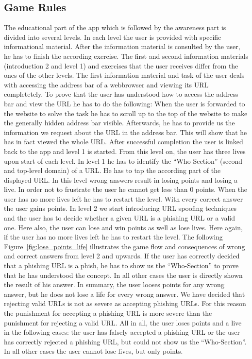 \subsection{Game Rules}
The educational part of the app which is followed by the awareness part is divided into several levels. In each level the user is provided with specific informational material. After the information material is consulted by the user, he has to finish the according exercise. The first  and second information materials (introduction 2 and level 1) and exercises that the user receives differ from the ones of the other levels. The first information material and task of the user deals with accessing the address bar of a webbrowser and viewing its URL completetely. To prove that the user has understood how to access the address bar and view the URL he has to do the following: When the user is forwarded to the website to solve the task he has to scroll up to the top of the website to make the generally hidden address bar visible. Afterwards, he has to provide us the information we request about the URL in the address bar. This will show that he has in fact viewed the whole URL. After successful completion the user is linked back to the app and level 1 is started. From this level on, the user has three lives upon start of each level. In level 1 he has to identify the ``Who-Section'' (second- and top-level domain) of a URL. He has to tap the according part of the displayed URL. In this level wrong answers result in losing points and losing a live. In order not to frustrate the user he cannot get less than 0 points. When the user has no more lives left he has to restart the level. With every correct answer the user gains points.  In level 2 we start introducing URL spoofing techniques and the user has to decide whether a given URL is a phishing URL or a valid one. Here also, the user can lose and win points as well as lose lives. Here again, if the user has no more lives left he has to restart the level. The following Figure~\ref{fig:lose_points_life} illustrates the game flow and consequences of wrong and correct answers from level 2 and upwards. If the user has correctly decided that a phishing URL is a phish, he has to show us the ``Who-Section'' to prove that he has understood the concept. In all other cases the user is directly shown the result of his answer. In summary, the user looses points for any wrong answer, but he does not lose a life for every wrong answer. We have decided that rejecting valid URLs is not as severe as accepting phishing URLs. For this reason the punishment for accepting a phishing URL is more severe than the punishment for rejecting a valid URL. All in all, the user loses points and a live in the following cases: the user has falsely accepted a phishing URL or the user has correctly rejected a phishing URL, but could not show us the ``Who-Section''. In all other cases the user cannot lose lives, but only points.

